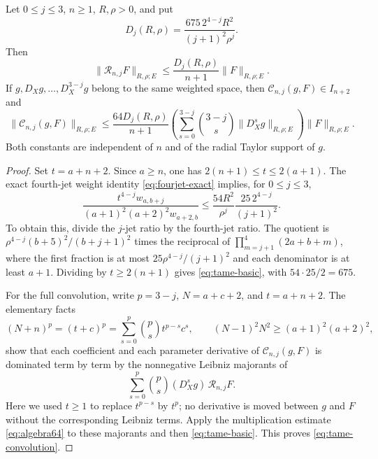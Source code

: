 \begin{theorem}\label{thm:convolution-smoothing}
Let $0\le j\le3$, $n\ge1$, $R,\rho>0$, and put
\begin{equation}\label{eq:tame-constant}
 D_j(R,\rho)=\frac{675\,2^{4-j}R^2}{(j+1)^2\rho^j}.
\end{equation}
Then
\begin{equation}\label{eq:tame-basic}
 \|\mathcal R_{n,j}F\|_{R,\rho;E}
 \le\frac{D_j(R,\rho)}{n+1}\|F\|_{R,\rho;E}.
\end{equation}
If $g,D_Xg,\ldots,D_X^{3-j}g$ belong to the same weighted space, then $\mathcal C_{n,j}(g,F)\in I_{n+2}$ and
\begin{equation}\label{eq:tame-convolution}
 \|\mathcal C_{n,j}(g,F)\|_{R,\rho;E}
 \le\frac{64D_j(R,\rho)}{n+1}
 \left(\sum_{s=0}^{3-j}\binom{3-j}{s}\|D_X^sg\|_{R,\rho;E}\right)
 \|F\|_{R,\rho;E}.
\end{equation}
Both constants are independent of $n$ and of the radial Taylor support of $g$.
\end{theorem}
\begin{proof}
Set $t=a+n+2$. Since $a\ge n$, one has
$2(n+1)\le t\le2(a+1)$. The exact fourth-jet weight identity
\eqref{eq:fourjet-exact} implies, for $0\le j\le3$,
\[
 \frac{t^{4-j}w_{a,b+j}}{(a+1)^2(a+2)^2w_{a+2,b}}
 \le \frac{54R^2}{\rho^j}\frac{25\,2^{4-j}}{(j+1)^2}.
\]
To obtain this, divide the $j$-jet ratio by the fourth-jet ratio. The quotient is
$\rho^{4-j}(b+5)^2/(b+j+1)^2$ times the reciprocal of
$\prod_{m=j+1}^4(2a+b+m)$, where the first fraction is at most
$25\rho^{4-j}/(j+1)^2$ and each denominator is at least $a+1$.
Dividing by $t\ge2(n+1)$ gives \eqref{eq:tame-basic}, with
$54\cdot25/2=675$.

For the full convolution, write $p=3-j$, $N=a+c+2$, and
$t=a+n+2$. The elementary facts
\[
 (N+n)^p=(t+c)^p=\sum_{s=0}^p\binom p s t^{p-s}c^s,
 \qquad (N-1)^2N^2\ge(a+1)^2(a+2)^2,
\]
show that each coefficient and each parameter derivative of
$\mathcal C_{n,j}(g,F)$ is dominated term by term by the nonnegative
Leibniz majorants of
\[\sum_{s=0}^p\binom p s(D_X^sg)\,\mathcal R_{n,j}F.\]
Here we used $t\ge1$ to replace $t^{p-s}$ by $t^p$; no derivative is moved between $g$ and $F$ without the corresponding Leibniz terms. Apply the multiplication estimate
\eqref{eq:algebra64} to these majorants and then
\eqref{eq:tame-basic}. This proves \eqref{eq:tame-convolution}.
\end{proof}

